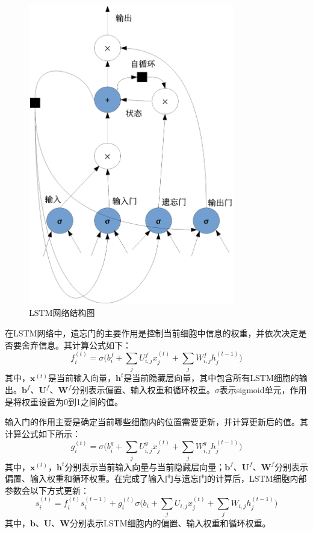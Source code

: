 \begin{figure}[htbp]
    \begin{center}
        \includegraphics[width=0.8\textwidth]{../graphics/LSTM_basic_arch.eps}
        \caption{LSTM网络结构图}
        \label{fig:LSTM_arch}
    \end{center}
\end{figure}

在LSTM网络中，遗忘门的主要作用是控制当前细胞中信息的权重，并依次决定是否要舍弃信息。其计算公式如下：
\begin{equation}
    f_i^{(t)}=\sigma\bigg(b_i^f+\sum_jU_{i,j}^fx_j^(t)+\sum_jW_{i,j}^fh_j^{(t-1)}\bigg)
    \label{eq:3}
\end{equation}
其中，$\textbf{x}^{(t)}$是当前输入向量，$\textbf{h}^t$是当前隐藏层向量，其中包含所有LSTM细胞的输出。$\textbf{b}^f$、$\textbf{U}^f$、$\textbf{W}^f$分别表示偏置、输入权重和循环权重。$\sigma$表示sigmoid单元，作用是将权重设置为0到1之间的值。

输入门的作用主要是确定当前哪些细胞内的位置需要更新，并计算更新后的值。其计算公式如下所示：
\begin{equation}
    g_i^{(t)}=\sigma\bigg(b_i^g+\sum_jU_{i,j}^gx_j^{(t)}+\sum_jW_{i,j}^gh_j^{(t-1)}\bigg)
    \label{eq:4}
\end{equation}
其中，$\textbf{x}^{(t)}$，$\textbf{h}^t$分别表示当前输入向量与当前隐藏层向量；$\textbf{b}^f$、$\textbf{U}^f$、$\textbf{W}^f$分别表示偏置、输入权重和循环权重。在完成了输入门与遗忘门的计算后，LSTM细胞内部参数会以下方式更新：
\begin{equation}
    s_i^{(t)}=f_i^{(t)}s_i^{(t-1)}+g_i^{(t)}\sigma\bigg(b_i+\sum_jU_{i,j}x_j^{(t)}+\sum_jW_{i,j}h_j^{(t-1)}\bigg)
    \label{eq:5}
\end{equation}
其中，$\textbf{b}$、$\textbf{U}$、$\textbf{W}$分别表示LSTM细胞内的偏置、输入权重和循环权重。

